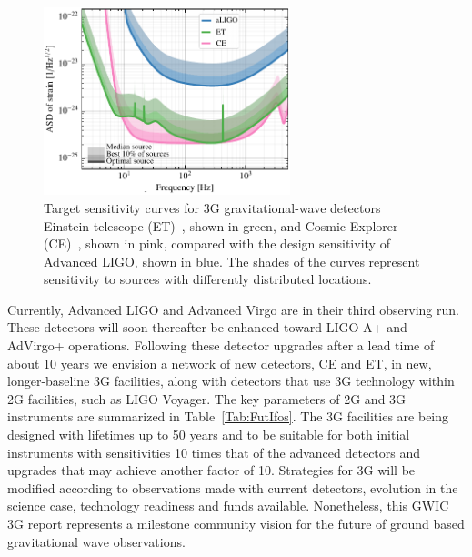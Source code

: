 \begin{figure}
\centering
\includegraphics*[width= 0.64\textwidth]{Figures/noises_percentiles-Voyager.pdf}
\caption{Target sensitivity curves for 3G gravitational-wave detectors Einstein telescope (ET)~\cite{ET2011}, shown in green, and Cosmic Explorer (CE)~\cite{CosmicExplorer2017}, shown in pink, compared with the design sensitivity of Advanced LIGO, shown in blue. 
The shades of the curves represent sensitivity to sources with differently distributed locations.}
\label{fig:3GSens}
\end{figure}

Currently, Advanced LIGO and Advanced Virgo are in their third observing run. These detectors will soon thereafter be enhanced toward LIGO A+ and AdVirgo+ operations. Following these detector upgrades after a lead time of about 10 years we envision a network of new detectors, CE and ET, in new, longer-baseline 3G facilities, along with detectors that use 3G technology within 2G facilities, such as LIGO Voyager.
The key parameters of 2G and 3G instruments are summarized in Table~\ref{Tab:FutIfos}.
The 3G facilities are being designed with lifetimes up to 50 years and to be suitable for both initial instruments with sensitivities 10 times that of the advanced detectors and upgrades that may achieve another factor of 10.
Strategies for 3G will be modified according to observations made with current detectors, evolution in the science case, technology readiness and funds available. Nonetheless, this GWIC 3G report represents a milestone community vision for the future of ground based gravitational wave observations. 




